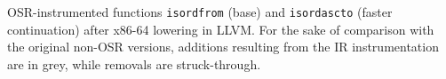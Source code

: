 \label{fig:isordx86-64} OSR-instrumented functions {\tt isordfrom} (base) and {\tt isordascto} (faster continuation) after x86-64 lowering in LLVM. For the sake of comparison with the original non-OSR versions, additions resulting from the IR instrumentation are in grey, while removals are struck-through.